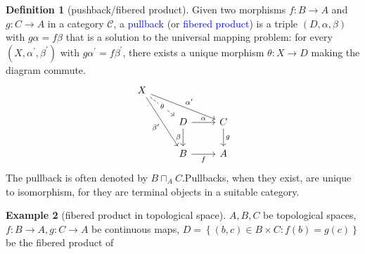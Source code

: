 \documentclass[a4paper,12pt]{article}
\newcommand{\bbrace}[1]{\left\{ #1 \right\} }
\newcommand{\blue}[1]{\textcolor{blue}{#1}}
\theoremstyle{definition}
\newtheorem{defn}{Definition}[subsection]
\newtheorem{exam}[defn]{Example}
\begin{document}
\begin{defn}[pushback/fibered product]
    Given two morphisms $f: B \rightarrow A$ and $g: C \rightarrow A$ in a category $\mathcal{C}$, a \blue{pullback} (or \blue{fibered product}) is a triple $(D, \alpha, \beta)$ with $g \alpha=f \beta$ that is a solution to the universal mapping problem: for every $\left(X, \alpha^{\prime}, \beta^{\prime}\right)$ with $g \alpha^{\prime}=f \beta^{\prime}$, there exists a unique morphism $\theta: X \rightarrow D$ making the diagram commute.
    \begin{equation*}
        \begin{tikzcd}
            X \\
            & D & C \\
            & B & A
            \arrow["\alpha", from=2-2, to=2-3]
            \arrow["g", from=2-3, to=3-3]
            \arrow["f"', from=3-2, to=3-3]
            \arrow["\beta"', from=2-2, to=3-2]
            \arrow["{\alpha^{\prime}}", from=1-1, to=2-3]
            \arrow["{\beta^{\prime}}"', from=1-1, to=3-2]
            \arrow["\theta"{description}, dashed, from=1-1, to=2-2]
        \end{tikzcd}
    \end{equation*}
    The pullback is often denoted by $B \sqcap_A C$.Pullbacks, when they exist, are unique to isomorphism, for they are terminal objects in a suitable category.
\end{defn}
\begin{exam}[fibered product in topological space]
    $A,B,C$ be topological spaces, $f:B\rightarrow A, g:C\rightarrow A$ be continuous maps, $D=\bbrace{(b,c)\in B\times C:f(b)=g(c)}$ be the fibered product of
\end{exam}
\end{document}
